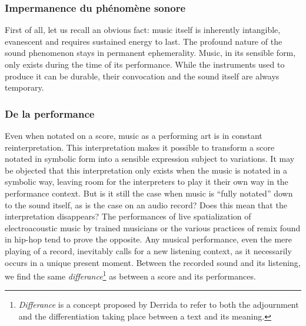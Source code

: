 \subsubsection{Impermanence du phénomène sonore}
\noindent First of all, let us recall an obvious fact: music itself is inherently intangible, evanescent and requires sustained energy to last. The profound nature of the sound phenomenon stays in permanent ephemerality. Music, in its sensible form, only exists during the time of its performance. While the instruments used to produce it can be durable, their convocation and the sound itself are always temporary. 

\subsubsection{De la performance}
\noindent Even when notated on a score, music as a performing art is in constant reinterpretation. This interpretation makes it possible to transform a score notated in symbolic form into a sensible expression subject to variations. It may be objected that this interpretation only exists when the music is notated in a symbolic way, leaving room for the interpreters to play it their own way in the performance context. But is it still the case when music is “fully notated” down to the sound itself, as is the case on an audio record? Does this mean that the interpretation disappears? The performances of live spatialization of electroacoustic music by trained musicians or the various practices of remix found in hip-hop tend to prove the opposite. Any musical performance, even the mere playing of a record, inevitably calls for a new listening context, as it necessarily occurs in a unique present moment. Between the recorded sound and its listening, we find the same \textit{differance}\footnote{\textit{Differance} is a concept proposed by Derrida \cite{derrida_lecriture_2014} to refer to both the adjournment and the differentiation taking place between a text and its meaning.} as between a score and its performances.

